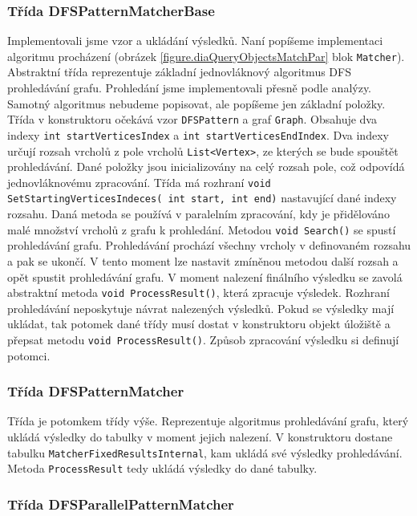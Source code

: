 \subsubsection{Třída DFSPatternMatcherBase}

Implementovali jsme vzor a ukládání výsledků.
Naní popíšeme implementaci algoritmu procházení (obrázek \ref{figure.diaQueryObjectsMatchPar} blok \texttt{Matcher}).
Abstraktní třída reprezentuje základní jednovláknový algoritmus DFS prohledávání grafu.
Prohledání jsme implementovali přesně podle analýzy.
Samotný algoritmus nebudeme popisovat, ale popíšeme jen základní položky.
Třída v konstruktoru očekává vzor \texttt{DFSPattern} a graf \texttt{Graph}.
Obsahuje dva indexy \texttt{int startVerticesIndex} a \texttt{int startVerticesEndIndex}.
Dva indexy určují rozsah vrcholů z pole vrcholů \texttt{List<Vertex>}, ze kterých se bude spouštět prohledávání.
Dané položky jsou inicializovány na celý rozsah pole, což odpovídá jednovláknovému zpracování.
Třída má rozhraní \texttt{void SetStartingVerticesIndeces( int start, int end)} nastavující dané indexy rozsahu.
Daná metoda se používá v paralelním zpracování, kdy je přidělováno malé množství vrcholů z grafu k prohledání.
Metodou \texttt{void Search()} se spustí prohledávání grafu.
Prohledávání prochází všechny vrcholy v definovaném rozsahu a pak se ukončí.
V tento moment lze nastavit zmíněnou metodou další rozsah a opět spustit prohledávání grafu.
V moment nalezení finálního výsledku se zavolá abstraktní metoda \texttt{void ProcessResult()}, která zpracuje výsledek.
Rozhraní prohledávání neposkytuje návrat nalezených výsledků.
Pokud se výsledky mají ukládat, tak potomek dané třídy musí dostat v konstruktoru objekt úložiště a přepsat metodu \texttt{void ProcessResult()}.
Způsob zpracování výsledku si definují potomci.

\subsubsection{Třída DFSPatternMatcher}

Třída je potomkem třídy výše.
Reprezentuje algoritmus prohledávání grafu, který ukládá výsledky do tabulky v moment jejich nalezení.
V konstruktoru dostane tabulku \texttt{MatcherFixedResultsInternal}, kam ukládá své výsledky prohledávání.
Metoda \texttt{ProcessResult} tedy ukládá výsledky do dané tabulky.

\subsubsection{Třída DFSParallelPatternMatcher}

